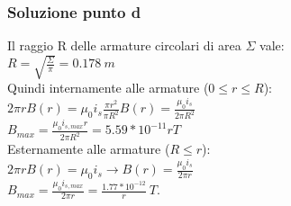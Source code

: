 \documentclass[../../main.tex]{subfiles}
\begin{document}
\subsubsection*{Soluzione punto d}
Il raggio R delle armature circolari di area $\Sigma$ vale:\\
$R = \sqrt{\frac{\Sigma}{\pi}} = 0.178\ m$\\
Quindi internamente alle armature ($0 \le r \le R$):\\
$2\pi r B(r) = \mu_0 i_s \frac{\pi r^2}{\pi R^2}$\tab $B(r) = \frac{\mu_0 i_s}{2\pi R^2}$\\
$B_{max} = \frac{\mu_0 i_{s, max} r}{2\pi R^2} = 5.59 * 10^{-11} r T$\\
Esternamente alle armature ($ R \le r$):\\
$2\pi rB(r) = \mu_0 i_s \rightarrow B(r) = \frac{\mu_0 i_s}{2\pi r}$\\
$B_{max}  =\frac{\mu_0 i_{s,max}}{2\pi r} = \frac{1.77 * 10^{-12}}{r}\ T$.
\newpage
\end{document}
